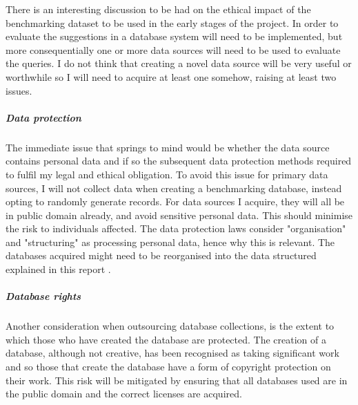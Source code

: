 There is an interesting discussion to be had on the ethical impact of the benchmarking dataset to be used in the early stages of the project. In order to evaluate the suggestions in \cite{RelationalAlgebraByWayOfAdjunctions} a database system will need to be implemented, but more consequentially one or more data sources will need to be used to evaluate the queries. I do not think that creating a novel data source will be very useful or worthwhile so I will need to acquire at least one somehow, raising at least two issues.
\subparagraph*{Data protection} The immediate issue that springs to mind would be whether the data source contains personal data and if so the subsequent data protection methods required to fulfil my legal and ethical obligation. To avoid this issue for primary data sources, I will not collect data when creating a benchmarking database, instead opting to randomly generate records. For data sources I acquire, they will all be in public domain already, and avoid sensitive personal data. This should minimise the risk to individuals affected. The data protection laws consider "organisation" and "structuring" as processing personal data, hence why this is relevant. The databases acquired might need to be reorganised into the data structured explained in this report .  
\subparagraph*{Database rights} Another consideration when outsourcing database collections, is the extent to which those who have created the database are protected. The creation of a database, although not creative, has been recognised as taking significant work and so those that create the database have a form of copyright protection on their work.  This risk will be mitigated by ensuring that all databases used are in the public domain and the correct licenses are acquired.

